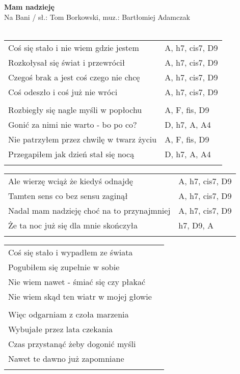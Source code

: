 \documentclass[a5paper]{article}
\begin{document}


\noindent
\fontsize{12pt}{15pt}\selectfont
\textbf{Mam nadzieję} \\
\fontsize{8pt}{10pt}\selectfont
Na Bani / sł.: Tom Borkowski, muz.: Bartłomiej Adamczak\\ \\
\fontsize{10pt}{12pt}\selectfont
{}
\begin{tabular}{@{}p{8.00cm}p{3cm}@{}}
\noindent
Coś się stało i nie wiem gdzie jestem & A, h7, cis7, D9 \\
Rozkołysał się świat i przewrócił & A, h7, cis7, D9 \\
Czegoś brak a jest coś czego nie chcę & A, h7, cis7, D9 \\
Coś odeszło i coś już nie wróci	& A, h7, cis7, D9 \\ \\ 

Rozbiegły się nagle myśli w popłochu & A, F, fis, D9 \\
Gonić za nimi nie warto - bo po co? & D, h7, A, A4 \\
Nie patrzyłem przez chwilę w twarz życiu & A, F, fis, D9 \\
Przegapiłem jak dzień stał się nocą	& D, h7, A, A4 \\ \\
\end{tabular}

\noindent
\begin{tabular}{@{}p{7.00cm}p{3cm}@{}}
Ale wierzę wciąż że kiedyś odnajdę & A, h7, cis7, D9 \\
Tamten sens co bez sensu zaginął & A, h7, cis7, D9 \\
Nadal mam nadzieję choć na to przynajmniej & A, h7, cis7, D9 \\
Że ta noc już się dla mnie skończyła & h7, D9, A \\ \\
\end{tabular}

\noindent
\begin{tabular}{@{}p{8.50cm}p{3cm}@{}}
Coś się stało i wypadłem ze świata \\
Pogubiłem się zupełnie w sobie \\
Nie wiem nawet - śmiać się czy płakać \\
Nie wiem skąd ten wiatr w mojej głowie \\ \\

Więc odgarniam z czoła marzenia \\
Wybujałe przez lata czekania \\
Czas przystanąć żeby dogonić myśli \\
Nawet te dawno już zapomniane \\ \\
\end{tabular}
\end{document}

